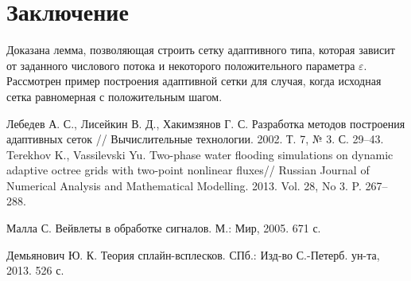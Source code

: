 \documentclass{spisok-article}
\begin{document}
      \section{Заключение}
      Доказана лемма, позволяющая строить сетку адаптивного типа, которая зависит от заданного числового потока и некоторого положительного параметра $\varepsilon$. Рассмотрен пример построения адаптивной сетки для случая, когда исходная сетка равномерная с положительным шагом.

\newpage
\renewcommand\refname{Литература}
\begin{thebibliography}{8}

 Лебедев А. С., Лисейкин В. Д., Хакимзянов Г. С. Разработка
    методов построения адаптивных сеток // Вычислительные технологии. 2002.
    Т. 7, № 3. С. 29--43.
 Terekhov K., Vassilevski Yu. Two-phase water
    flooding simu\-la\-tions on dynamic adaptive octree grids with
    two-point nonlinear fluxes// Russian Journal of Numerical Analysis
    and Mathematical Modelling. 2013. Vol. 28, No 3. P. 267--288.

 Малла С. Вейвлеты в обработке сигналов. М.: Мир, 2005. 671 с.

 Демьянович Ю. К. Теория сплайн-всплесков. СПб.: Изд-во \linebreak С.-Петерб. ун-та, 2013. 526 с.

\end{thebibliography}
\end{document}
